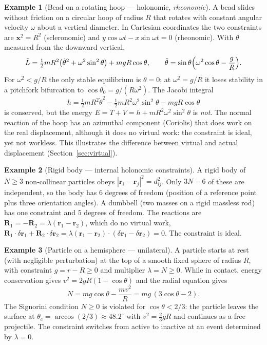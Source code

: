 \documentclass[11pt,a4paper]{article}
\theoremstyle{definition}
\newtheorem{example}{Example}[section]
\theoremstyle{plain}
\theoremstyle{remark}
\begin{document}
\begin{example}[Bead on a rotating hoop --- holonomic, \emph{rheonomic}]\label{ex:hoop}
A bead slides without friction on a circular hoop of radius $R$ that rotates with constant
angular velocity $\omega$ about a vertical diameter. In Cartesian coordinates the two
constraints are $\mathbf x^2=R^2$ (scleronomic) and $y\cos\omega t-x\sin\omega t=0$
(rheonomic). With $\theta$ measured from the downward vertical,
\[
  \tilde L=\tfrac12mR^2\bigl(\dot\theta^2+\omega^2\sin^2\theta\bigr)+mgR\cos\theta,\qquad
  \ddot\theta=\sin\theta\Bigl(\omega^2\cos\theta-\frac gR\Bigr).
\]
For $\omega^2<g/R$ the only stable equilibrium is $\theta=0$; at $\omega^2=g/R$ it
loses stability in a pitchfork bifurcation to $\cos\theta_0=g/(R\omega^2)$. The Jacobi integral
\[
  h=\tfrac12mR^2\dot\theta^2-\tfrac12mR^2\omega^2\sin^2\theta-mgR\cos\theta
\]
is conserved, but the energy $E=T+V=h+mR^2\omega^2\sin^2\theta$ is \emph{not}. The
normal reaction of the hoop has an azimuthal component (Coriolis) that does work on the real
displacement, although it does no virtual work: the constraint is ideal, yet not
workless. This illustrates the difference between virtual and actual displacement
(Section~\ref{sec:virtual}).
\end{example}

\begin{example}[Rigid body --- internal holonomic constraints]\label{ex:rigid}
A rigid body of $N\ge3$ non-collinear particles obeys $|\mathbf r_i-\mathbf r_j|^2=d_{ij}^2$.
Only $3N-6$ of these are independent, so the body has $6$ degrees of freedom (position of
a reference point plus three orientation angles). A dumbbell (two masses on a rigid massless rod) has one
constraint and $5$ degrees of freedom. The reactions are $\mathbf R_1=-\mathbf R_2=\lambda(\mathbf r_1-\mathbf r_2)$,
which do no virtual work, $\mathbf R_1\cdot\delta\mathbf r_1+\mathbf R_2\cdot\delta\mathbf r_2
=\lambda(\mathbf r_1-\mathbf r_2)\cdot(\delta\mathbf r_1-\delta\mathbf r_2)=0$. The constraint is
ideal.
\end{example}

\begin{example}[Particle on a hemisphere --- unilateral]\label{ex:hemisphere}
A particle starts at rest (with negligible perturbation) at the top of a smooth fixed sphere of radius
$R$, with constraint $g=r-R\ge0$ and multiplier $\lambda=N\ge0$. While in contact,
energy conservation gives $v^2=2gR(1-\cos\theta)$ and the radial equation gives
\[
  N=mg\cos\theta-\frac{mv^2}R=mg\,(3\cos\theta-2).
\]
The Signorini condition $N\ge0$ is violated for $\cos\theta<2/3$: the particle leaves the
surface at $\theta_c=\arccos(2/3)\approx48.2^\circ$ with $v^2=\tfrac23gR$ and continues as a
free projectile. The constraint switches from active to inactive at an event
determined by $\lambda=0$.
\end{example}
\end{document}
